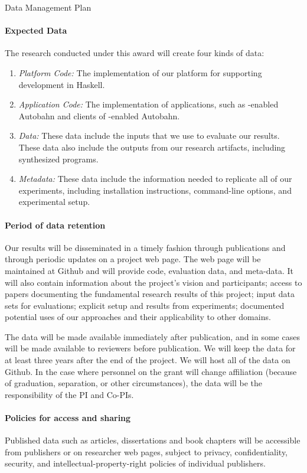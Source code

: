 \documentclass[12pt]{article}
\begin{document}
 \begin{large}
\begin{center}
Data Management Plan
\end{center}
\end{large}
\setcounter{page}{1}

\paragraph{Expected Data} The research conducted under this award will
create four kinds of data:

\begin{enumerate}
\item \textit{Platform Code:} The implementation of our platform for supporting \rasp development in Haskell.

\item \textit{Application Code:} The implementation of \rasp applications, such as \rasp-enabled Autobahn and clients of
\rasp-enabled Autobahn.

\item \textit{Data:} These data include the inputs that we use to evaluate our results.  These data also include the outputs from our research artifacts, including synthesized programs.

\item \textit{Metadata:} These data include the information needed to
  replicate all of our experiments, including installation instructions,
  command-line options, and experimental setup. 
\end{enumerate}

\paragraph{Period of data retention} Our results will be disseminated in
a timely fashion through publications and through periodic updates on
a project web page. The web page will be maintained at Github and will
provide code, evaluation data, and meta-data.  It will also contain information about the project's
vision and participants; access to papers documenting the fundamental
research results of this project; input data sets for evaluations;
explicit setup and results from experiments; documented potential uses
of our approaches and their applicability to other domains. 

The data will be made available immediately after
publication, and in some cases will be made available to reviewers
before publication. We will keep the data for at least three years
after the end of the project. We will host all of the data on Github. 
In the case where personnel on the grant will change affiliation
(because of graduation, separation, or other circumstances), the data
will be the responsibility of the PI and Co-PIs. 

\paragraph{Policies for access and sharing} 
Published data such as articles, dissertations and book chapters will
be accessible from publishers or on researcher web pages, subject to privacy, confidentiality, security, and
intellectual-property-right policies of individual publishers.
\end{document}
